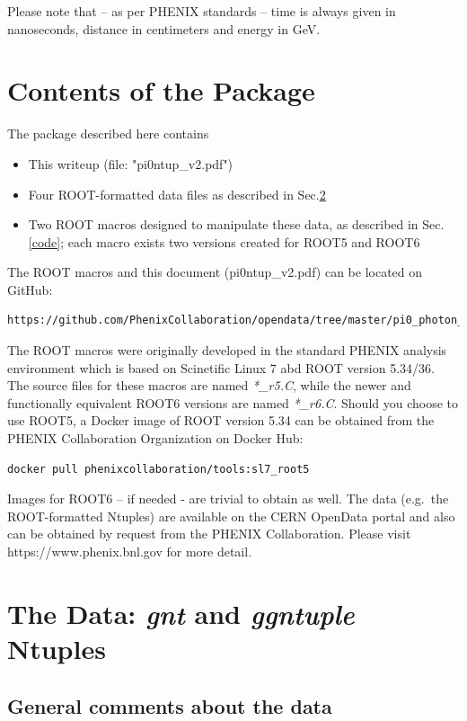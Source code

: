 \documentclass[pdftex,12pt,letter]{article}
\begin{document}
Please note that -- as per PHENIX standards -- time is always given in
nanoseconds, distance in centimeters and energy in GeV.

\section{Contents of the Package}
\label{contents}
The package described here contains
\begin{itemize}
\item This writeup (file: "pi0ntup\_v2.pdf")
\item Four ROOT-formatted data files as described in Sec.\ref{data}
\item Two ROOT macros designed to manipulate these data, as described in Sec.\ref{code}; each macro exists
two versions created for ROOT5 and ROOT6
\end{itemize}

\noindent
The ROOT macros and this document (pi0ntup\_v2.pdf) can be located on GitHub:
\begin{verbatim}
https://github.com/PhenixCollaboration/opendata/tree/master/pi0_photon_analysis
\end{verbatim}
\noindent
The ROOT macros were originally developed in the standard PHENIX
analysis environment which is based on Scinetific Linux 7 abd ROOT version 5.34/36.
The source files for these macros are named \textit{*\_r5.C}, while the newer and
functionally equivalent ROOT6 versions are named \textit{*\_r6.C}.
Should you choose to use ROOT5, a Docker image of ROOT version 5.34
can be obtained from the PHENIX Collaboration Organization on
Docker Hub:
\begin{verbatim}
docker pull phenixcollaboration/tools:sl7_root5
\end{verbatim}
\noindent
Images for ROOT6 -- if needed - are trivial to obtain as well.
The data (e.g.\, the ROOT-formatted Ntuples) are available on the CERN OpenData
portal and also can be obtained by request from the PHENIX Collaboration. Please visit https://www.phenix.bnl.gov
for more detail.


\section{The Data:  {\it gnt} and {\it ggntuple} Ntuples}
\label{data}
\subsection{General comments about the data}
\end{document}
